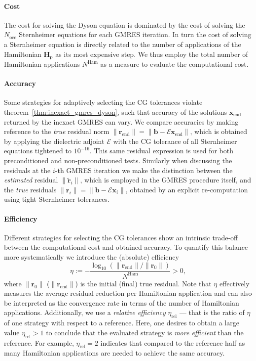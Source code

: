 \documentclass[hidelinks,onefignum,onetabnum]{siamart250211}
\newcommand{\Nocc}{N_{\mathrm{occ}}}
\newcommand{\Nham}{N^{\mathrm{Ham}}}
\newcommand{\releta}{\eta_{\mathrm{rel}}}
\newcommand{\rend}{\bm r_\text{end}}
\newcommand{\xend}{\bm x_\text{end}}
\begin{document}
\paragraph{Cost}
The cost for solving the Dyson equation
is dominated by the cost of solving the $\Nocc$ Sternheimer equations
for each GMRES iteration.
In turn the cost of solving a Sternheimer equation
is directly related to the number of applications of the Hamiltonian $\bm{H}_{\bm\rho}$
as its most expensive step.
We thus employ the total number of Hamiltonian applications $\Nham$
%
as a measure to evaluate the computational cost. %

\paragraph{Accuracy}
Some strategies for adaptively selecting
the CG tolerances violate theorem~\ref{thm:inexact_gmres_dyson},
such that accuracy of the solutions $\xend$ returned by the inexact GMRES can vary.
We compare accuracies by making reference to the \textit{true} residual
norm $\|\rend\| = \|\bm{b} - \bm{\mathcal E}\xend\|$,
which is obtained by applying the dielectric adjoint $\bm{\mathcal E}$
with the CG tolerance of all Sternheimer equations tightened to $10^{-16}$.
This same residual expression is used
for both preconditioned and non-preconditioned tests.
Similarly when discussing the residuals at the $i$-th GMRES iteration
we make the distinction between the \emph{estimated} residual $\|\widetilde{\bm{r}}_i\|$,
which is employed in the GMRES procedure itself,
and the \emph{true} residuals $\|\bm{r}_i\| = \|\bm{b} - \bm{\mathcal E}\bm{x}_i\|$,
obtained by an explicit re-computation using tight Sternheimer tolerances.

\paragraph{Efficiency}
Different strategies for selecting the CG tolerances show an intrinsic trade-off
between the computational cost and obtained accuracy.
To quantify this balance more systematically we introduce the (absolute) efficiency
\begin{equation}
\eta := -\dfrac{\log_{10} \left( \|\rend\| / \|\bm{r}_0\| \right)}{\Nham} > 0,
\end{equation}
where $\|\bm{r}_0\|$ ($\|\rend\|$) is the initial (final) true residual.
Note that $\eta$ effectively measures the average residual reduction
per Hamiltonian application and can also be interpreted as the
convergence rate in terms of the number of Hamiltonian applications.
%
%
Additionally, we use a \emph{relative efficiency} $\releta$
--- that is the ratio of $\eta$ of one strategy with respect to a reference.
Here, one desires to obtain a large value $\releta > 1$
to conclude that the evaluated strategy is \emph{more efficient} than the reference.
For example, $\releta = 2$ indicates that compared to the reference
half as many Hamiltonian applications are needed to achieve the same accuracy.
\end{document}
